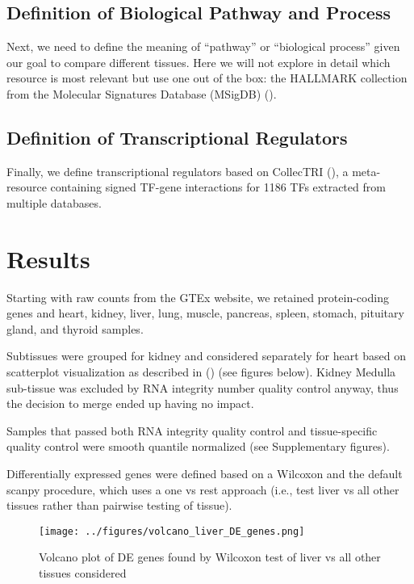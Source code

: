 \documentclass{article}
\begin{document}
\subsection{Definition of Biological Pathway and Process}

Next, we need to define the meaning of “pathway” or “biological process” given our goal to compare different tissues. Here we will not explore in detail which resource is most relevant but use one out of the box: the HALLMARK collection from the Molecular Signatures Database (MSigDB) (\cite{Liberzon2011-ex}).

\subsection{Definition of Transcriptional Regulators}

Finally, we define transcriptional regulators based on CollecTRI (\cite{Muller-Dott2023-ve}), a meta-resource containing signed TF-gene interactions for 1186 TFs extracted from multiple databases.


\section{Results}

Starting with raw counts from the GTEx website, we retained protein-coding genes and heart, kidney, liver, lung, muscle, pancreas, spleen, stomach, pituitary gland, and thyroid samples.

Subtissues were grouped for kidney and considered separately for heart based on scatterplot visualization as described in (\cite{Paulson2017-jv}) (see figures below). Kidney Medulla sub-tissue was excluded by RNA integrity number quality control anyway, thus the decision to merge ended up having no impact.

Samples that passed both RNA integrity quality control and tissue-specific quality control were smooth quantile normalized (see Supplementary figures).

Differentially expressed genes were defined based on a Wilcoxon and the default scanpy procedure, which uses a one vs rest approach (i.e., test liver vs all other tissues rather than pairwise testing of tissue). 

\begin{figure}[htbp]
  \centering
  \texttt{[image: ../figures/volcano\_liver\_DE\_genes.png]}
  \caption{Volcano plot of DE genes found by Wilcoxon test of liver vs all other tissues considered}
  \label{fig:volcano_liver_DE_genes}
\end{figure}
\FloatBarrier
\end{document}
